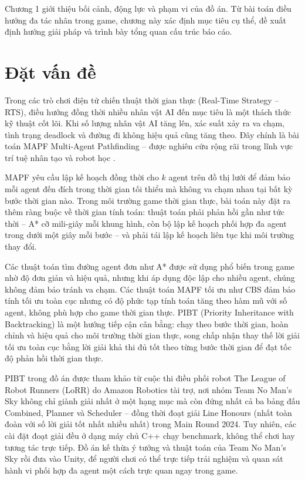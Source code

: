 \documentclass[../DoAn.tex]{subfiles}
\begin{document}
Chương 1 giới thiệu bối cảnh, động lực và phạm vi của đồ án. Từ bài toán điều hướng
đa tác nhân trong game, chương này xác định mục tiêu cụ thể, đề xuất định hướng giải
pháp và trình bày tổng quan cấu trúc báo cáo.

\section{Đặt vấn đề}
\label{section:1.1}

Trong các trò chơi điện tử chiến thuật thời gian thực (Real-Time Strategy -- RTS),
điều hướng đồng thời nhiều nhân vật AI đến mục tiêu là một thách thức kỹ thuật cốt lõi.
Khi số lượng nhân vật AI tăng lên, xác suất xảy ra va chạm, tình trạng deadlock và
đường đi không hiệu quả cũng tăng theo. Đây chính là bài toán MAPF Multi-Agent
Pathfinding -- được nghiên cứu rộng rãi trong lĩnh vực trí tuệ nhân tạo và robot học
\cite{stern2019mapf}.

MAPF yêu cầu lập kế hoạch đồng thời cho $k$ agent trên đồ thị lưới để đảm bảo mỗi
agent đến đích trong thời gian tối thiểu mà không va chạm nhau tại bất kỳ bước thời
gian nào. Trong môi trường game thời gian thực, bài toán này đặt ra thêm ràng buộc
về thời gian tính toán: thuật toán phải phản hồi gần như tức thời -- A* cỡ mili-giây mỗi
khung hình, còn bộ lập kế hoạch phối hợp đa agent trong dưới một giây mỗi bước -- và phải
tái lập kế hoạch liên tục khi môi trường thay đổi.

Các thuật toán tìm đường agent đơn như A* \cite{hart1968astar} được sử dụng phổ biến
trong game nhờ độ đơn giản và hiệu quả, nhưng khi áp dụng độc lập cho nhiều agent,
chúng không đảm bảo tránh va chạm. Các thuật toán MAPF tối ưu như CBS
\cite{sharon2015cbs} đảm bảo tính tối ưu toàn cục nhưng có độ phức tạp tính toán
tăng theo hàm mũ với số agent, không phù hợp cho game thời gian thực. PIBT (Priority
Inheritance with Backtracking) \cite{okumura2022pibt} là một hướng tiếp cận cân bằng:
chạy theo bước thời gian, hoàn chỉnh và hiệu quả cho môi trường thời gian thực, song
chấp nhận thay thế lời giải tối ưu toàn cục bằng lời giải khả thi đủ tốt theo từng
bước thời gian để đạt tốc độ phản hồi thời gian thực.

PIBT trong đồ án được tham khảo từ cuộc thi điều phối robot The League of Robot Runners
(LoRR) \cite{lorr2024} do Amazon Robotics tài trợ, nơi nhóm Team No Man's Sky không chỉ
giành giải nhất ở một hạng mục mà còn đứng nhất cả ba bảng đấu Combined, Planner và
Scheduler -- đồng thời đoạt giải Line Honours (nhất toàn đoàn với số lời giải tốt nhất
nhiều nhất) trong Main Round 2024. Tuy nhiên, các cài đặt đoạt giải đều ở dạng máy chủ
C++ chạy benchmark, không thể chơi hay tương tác trực tiếp. Đồ án kế thừa ý tưởng và
thuật toán của Team No Man's Sky rồi đưa vào Unity, để người chơi có thể trực tiếp trải
nghiệm và quan sát hành vi phối hợp đa agent một cách trực quan ngay trong game.
\end{document}

